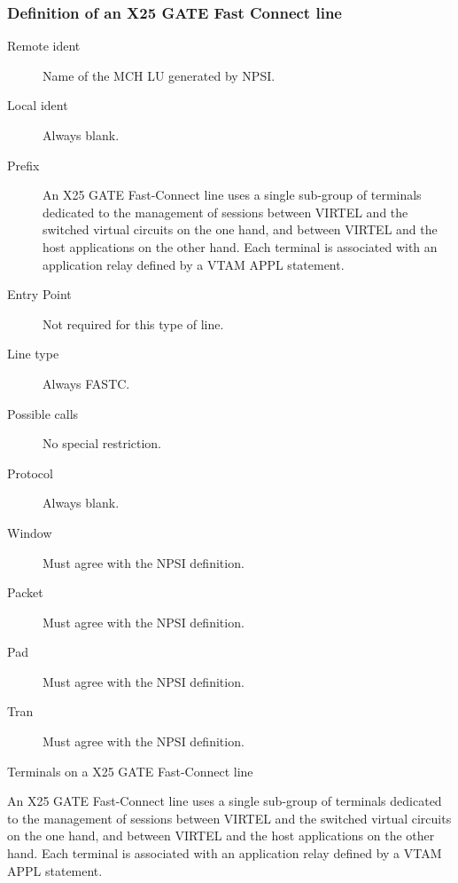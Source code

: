 \documentclass[letterpaper,10pt,english]{sphinxmanual}
\begin{document}
\subsubsection{Definition of an X25 GATE Fast Connect line}
\label{\detokenize{connectivity_guide:definition-of-an-x25-gate-fast-connect-line}}\begin{description}
\item[{Remote ident}] \leavevmode
Name of the MCH LU generated by NPSI.

\item[{Local ident}] \leavevmode
Always blank.

\item[{Prefix}] \leavevmode
An X25 GATE Fast-Connect line uses a single sub-group of terminals dedicated to the management of sessions between VIRTEL and the switched virtual circuits on the one hand, and between VIRTEL and the host applications on the other hand. Each terminal is associated with an application relay defined by a VTAM APPL statement.

\item[{Entry Point}] \leavevmode
Not required for this type of line.

\item[{Line type}] \leavevmode
Always FASTC.

\item[{Possible calls}] \leavevmode
No special restriction.

\item[{Protocol}] \leavevmode
Always blank.

\item[{Window}] \leavevmode
Must agree with the NPSI definition.

\item[{Packet}] \leavevmode
Must agree with the NPSI definition.

\item[{Pad}] \leavevmode
Must agree with the NPSI definition.

\item[{Tran}] \leavevmode
Must agree with the NPSI definition.

\end{description}

Terminals on a X25 GATE Fast-Connect line

An X25 GATE Fast-Connect line uses a single sub-group of terminals dedicated to the management of sessions between VIRTEL and the switched virtual circuits on the one hand, and between VIRTEL and the host applications on the other hand. Each terminal is associated with an application relay defined by a VTAM APPL statement.
\end{document}
